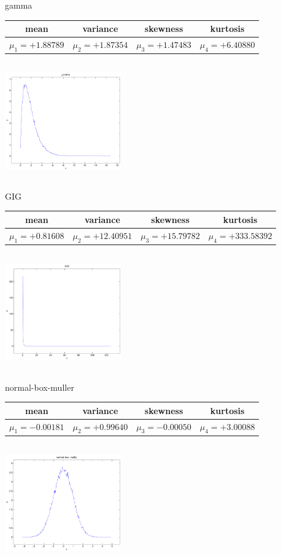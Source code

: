 \documentclass[9pt]{article}
\theoremstyle{plain}
\theoremstyle{definition}
\theoremstyle{remark}
\numberwithin{equation}{section}
\begin{document}
\newpage
gamma \begin{tabular}{|c|c|c|c|}  mean & variance & skewness & kurtosis \\  \hline
$\mu_1 = +1.88789$ & $\mu_2 = +1.87354$ & $\mu_3 = +1.47483$ & $\mu_4 =+6.40880$ \\
\end{tabular}

\includegraphics[width=5cm,height=5cm]{gamma.pdf}

GIG \begin{tabular}{|c|c|c|c|}  mean & variance & skewness & kurtosis \\  \hline
$\mu_1 = +0.81608$ & $\mu_2 = +12.40951$ & $\mu_3 = +15.79782$ & $\mu_4 =+333.58392$ \\
\end{tabular}

\includegraphics[width=5cm,height=5cm]{GIG.pdf}

normal-box-muller \begin{tabular}{|c|c|c|c|}  mean & variance & skewness & kurtosis \\  \hline
$\mu_1 = -0.00181$ & $\mu_2 = +0.99640$ & $\mu_3 = -0.00050$ & $\mu_4 =+3.00088$ \\
\end{tabular}

\includegraphics[width=5cm,height=5cm]{normal-box-muller.pdf}
\end{document}
